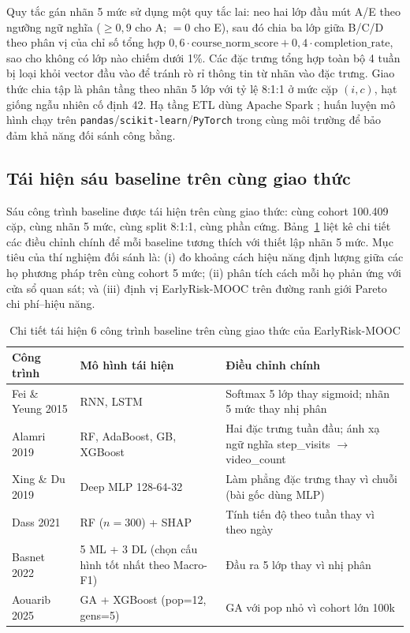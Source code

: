 Quy tắc gán nhãn 5 mức sử dụng một quy tắc lai: neo hai lớp đầu mút A/E theo ngưỡng ngữ nghĩa ($\geq 0{,}9$ cho A; $= 0$ cho E), sau đó chia ba lớp giữa B/C/D theo phân vị của chỉ số tổng hợp $0{,}6 \cdot \text{course\_norm\_score} + 0{,}4 \cdot \text{completion\_rate}$, sao cho không có lớp nào chiếm dưới 1\%. Các đặc trưng tổng hợp toàn bộ 4 tuần bị loại khỏi vector đầu vào để tránh rò rỉ thông tin từ nhãn vào đặc trưng. Giao thức chia tập là phân tầng theo nhãn 5 lớp với tỷ lệ 8:1:1 ở mức cặp $(i, c)$, hạt giống ngẫu nhiên cố định 42. Hạ tầng ETL dùng Apache Spark \cite{Zaharia2016}; huấn luyện mô hình chạy trên \texttt{pandas}/\texttt{scikit-learn}/\texttt{PyTorch} trong cùng môi trường để bảo đảm khả năng đối sánh công bằng.

\subsection{Tái hiện sáu baseline trên cùng giao thức}

Sáu công trình baseline được tái hiện trên cùng giao thức: cùng cohort 100.409 cặp, cùng nhãn 5 mức, cùng split 8:1:1, cùng phần cứng. Bảng~\ref{tab:baseline} liệt kê chi tiết các điều chỉnh chính để mỗi baseline tương thích với thiết lập nhãn 5 mức. Mục tiêu của thí nghiệm đối sánh là: (i) đo khoảng cách hiệu năng định lượng giữa các họ phương pháp trên cùng cohort 5 mức; (ii) phân tích cách mỗi họ phản ứng với cửa sổ quan sát; và (iii) định vị EarlyRisk-MOOC trên đường ranh giới Pareto chi phí--hiệu năng.

\begin{table}[H]
\centering
\caption{Chi tiết tái hiện 6 công trình baseline trên cùng giao thức của EarlyRisk-MOOC}
\label{tab:baseline}
\renewcommand{\arraystretch}{1.3}
\footnotesize
\begin{tabularx}{\textwidth}{@{}p{2.8cm} p{3.2cm} X@{}}
\toprule
\textbf{Công trình} & \textbf{Mô hình tái hiện} & \textbf{Điều chỉnh chính} \\
\midrule
Fei \& Yeung 2015 \cite{Fei2015} & RNN, LSTM & Softmax 5 lớp thay sigmoid; nhãn 5 mức thay nhị phân \\
Alamri 2019 \cite{Alamri2019} & RF, AdaBoost, GB, XGBoost & Hai đặc trưng tuần đầu; ánh xạ ngữ nghĩa step\_visits $\rightarrow$ video\_count \\
Xing \& Du 2019 \cite{Xing2019} & Deep MLP 128-64-32 & Làm phẳng đặc trưng thay vì chuỗi (bài gốc dùng MLP) \\
Dass 2021 \cite{Dass2021} & RF ($n=300$) + SHAP & Tính tiến độ theo tuần thay vì theo ngày \\
Basnet 2022 \cite{Basnet2022} & 5 ML + 3 DL (chọn cấu hình tốt nhất theo Macro-F1) & Đầu ra 5 lớp thay vì nhị phân \\
Aouarib 2025 \cite{Aouarib2025} & GA + XGBoost (pop=12, gens=5) & GA với pop nhỏ vì cohort lớn 100k \\
\bottomrule
\end{tabularx}
\end{table}

